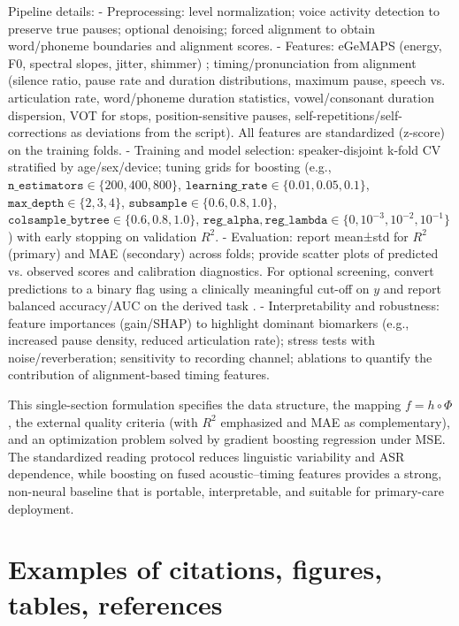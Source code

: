 \documentclass{article}
\begin{document}
Pipeline details:
- Preprocessing: level normalization; voice activity detection to preserve true pauses; optional denoising; forced alignment to obtain word/phoneme boundaries and alignment scores.  
- Features: eGeMAPS (energy, F0, spectral slopes, jitter, shimmer) \citep{gemaps2015}; timing/pronunciation from alignment (silence ratio, pause rate and duration distributions, maximum pause, speech vs. articulation rate, word/phoneme duration statistics, vowel/consonant duration dispersion, VOT for stops, position-sensitive pauses, self-repetitions/self-corrections as deviations from the script). All features are standardized (z-score) on the training folds.  
- Training and model selection: speaker-disjoint k-fold CV stratified by age/sex/device; tuning grids for boosting (e.g., $\texttt{n\_estimators}\in\{200,400,800\}$, $\texttt{learning\_rate}\in\{0.01,0.05,0.1\}$, $\texttt{max\_depth}\in\{2,3,4\}$, $\texttt{subsample}\in\{0.6,0.8,1.0\}$, $\texttt{colsample\_bytree}\in\{0.6,0.8,1.0\}$, $\texttt{reg\_alpha},\texttt{reg\_lambda}\in\{0,10^{-3},10^{-2},10^{-1}\}$) with early stopping on validation $R^2$.  
- Evaluation: report mean±std for $R^2$ (primary) and MAE (secondary) across folds; provide scatter plots of predicted vs. observed scores and calibration diagnostics. For optional screening, convert predictions to a binary flag using a clinically meaningful cut-off on $y$ and report balanced accuracy/AUC on the derived task \citep{adress2020,adresso2021}.  
- Interpretability and robustness: feature importances (gain/SHAP) to highlight dominant biomarkers (e.g., increased pause density, reduced articulation rate); stress tests with noise/reverberation; sensitivity to recording channel; ablations to quantify the contribution of alignment-based timing features.

This single-section formulation specifies the data structure, the mapping $f=h\circ\Phi$, the external quality criteria (with $R^2$ emphasized and MAE as complementary), and an optimization problem solved by gradient boosting regression under MSE. The standardized reading protocol reduces linguistic variability and ASR dependence, while boosting on fused acoustic–timing features provides a strong, non-neural baseline that is portable, interpretable, and suitable for primary-care deployment.



\section{Examples of citations, figures, tables, references}
\label{sec:others}
\end{document}
